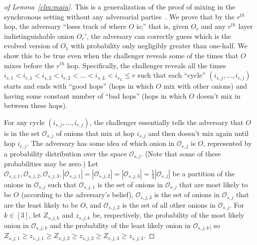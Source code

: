 \documentclass[runningheads,a4paper]{llncs}
\begin{document}
\begin{proof}[of Lemma~\ref{clm:main}]
This is a generalization of the proof of mixing in the synchronous setting without any adversarial parties~\cite[Theorem 10]{ICALP:AndLysUpf18}. 
We prove that by the $r^{th}$ hop, the adversary ``loses track of where $O$ is;'' that is, 
given $O_r$ and any $r^{th}$ layer indistinguishable onion $O_r'$, the adversary can correctly guess which is the evolved version of $O_1$ with probability only negligibly greater than one-half. 
We show this to be true even when the challenger reveals some of the times that $O$ mixes before the $r^{th}$ hop. 
Specifically, the challenger reveals all the times $i_{s, 1} < i_{e, 1} < i_{s, 2} < i_{e, 2} < \dots < i_{s, L} < i_{s_L} \le r$ such that each ``cycle'' $(i_{s, j}, \dots, i_{e, j})$ starts and ends with ``good hops'' (hops in which $O$ mix with other onions) and having some constant number of ``bad hops'' (hops in which $O$ doesn't mix in between these hops). 

For any cycle $(i_{s, j}, \dots, i_{e, j})$, the challenger essentially tells the adversary that $O$ is in the set $\mathcal{O}_{s, j}$ of onions that mix at hop $i_{s, j}$ and then doesn't mix again until hop $i_{e, j}$. The adversary has some idea of which onion in $\mathcal{O}_{s, j}$ is $O$, represented by a probability distribution over the space $\mathcal{O}_{s, j}$. (Note that some of these probabilities may be zero.) %
Let 
$\mathcal{O}_{s, j, 1}, 
\mathcal{O}_{s, j, 2}, 
\mathcal{O}_{s, j, 3}, |\mathcal{O}_{s, j,1}|=|\mathcal{O}_{s, j,2}|=|\mathcal{O}_{s, j,3}|=\frac{1}{3}|\mathcal{O}_{s, j}|$ be a partition of the onions in $\mathcal{O}_{s, j}$ such that $\mathcal{O}_{s, j,1}$ is the set of onions in $\mathcal{O}_{s, j}$ that are most likely to be $O$ (according to the adversary's belief), $\mathcal{O}_{s, j,3}$ is the set of onions in $\mathcal{O}_{s, j}$ that are the least likely to be $O$, and $\mathcal{O}_{s, j,2}$ is the set of all other onions in $\mathcal{O}_{s, j}$. 
For $k\in[3]$, let $Z_{s,j,k}$ and $z_{s,j,k}$ be, respectively, the probability of the most likely onion in $\mathcal{O}_{s,j,k}$ and the probability of the least likely onion in $\mathcal{O}_{s,j,k}$; so $Z_{s,j,1} \ge z_{s,j,1} \ge Z_{s,j,2} \ge z_{s,j,2} \ge Z_{s,j,3} \ge z_{s,j,3}$.


\end{proof}
\end{document}

